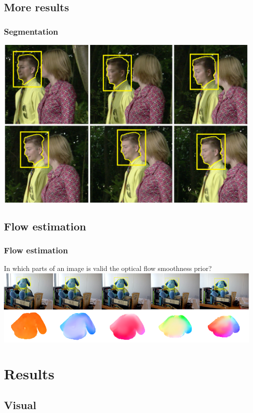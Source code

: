 \documentclass{beamer}
\begin{document}
\subsection{More results}

\begin{frame}
	\frametitle{Segmentation}
\includegraphics[width=1.00\textwidth]{../images/Sequence2.png}
\end{frame}

\subsection{Flow estimation}

\begin{frame}
	\frametitle{Flow estimation}
	In which parts of an image is valid the optical flow smoothness prior?
\includegraphics[width=1.00\textwidth]{../images/objectflow.png}
\end{frame}

\section{Results}

\subsection{Visual}
\end{document}
